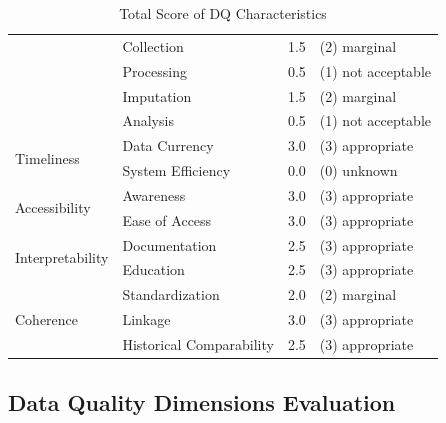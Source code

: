 \begin{table}[htbp]
\begin{tabular}{llll}
                                            & Collection                    & 1.5               & (2) marginal          \\
                                            & Processing                    & 0.5               & (1) not acceptable    \\
                                            & Imputation                    & 1.5               & (2) marginal          \\
                                            & Analysis                      & 0.5               & (1) not acceptable    \\ \midrule
        \multirow{2}{*}{Timeliness}         & Data Currency                 & 3.0               & (3) appropriate       \\
                                            & System Efficiency             & 0.0               & (0) unknown           \\ \midrule
        \multirow{2}{*}{Accessibility}      & Awareness                     & 3.0               & (3) appropriate       \\
                                            & Ease of Access                & 3.0               & (3) appropriate       \\ \midrule
        \multirow{2}{*}{Interpretability}   & Documentation                 & 2.5               & (3) appropriate       \\
                                            & Education                     & 2.5               & (3) appropriate       \\ \midrule
        \multirow{3}{*}{Coherence}          & Standardization               & 2.0               & (2) marginal          \\
                                            & Linkage                       & 3.0               & (3) appropriate       \\
                                            & Historical Comparability      & 2.5               & (3) appropriate       \\

        \bottomrule
    \end{tabular}

    \caption{Total Score of DQ Characteristics}
    \label{table:characteristics-score}
\end{table}
\FloatBarrier

\subsection{Data Quality Dimensions Evaluation}

